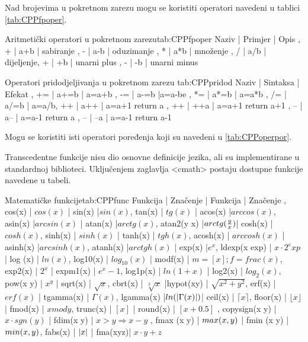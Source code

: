\documentclass[11pt]{book}
\begin{document}
Nad brojevima u pokretnom zarezu mogu se koristiti operatori navedeni u tablici \ref{tab:CPPfpoper}.

 {Aritmetički operatori u pokretnom zarezu}{tab:CPPfpoper}
{
  Naziv | Primjer  | Opis ,
  + | a+b | sabiranje ,
  - | a-b | oduzimanje ,
  * | a*b | množenje ,
  / | a/b | dijeljenje,
  + | +b  | unarni plus ,
  - | -b  | unarni minus
}

 {Operatori pridodjeljivanja u pokretnom zarezu} {tab:CPPpridod}
{
  Naziv | Sintaksa  | Efekat ,
  +=    | a+=b      | a=a+b ,
  -=    | a-=b      |a=a-be ,
  *=    | a*=b      | a=a*b ,
  /=    |  a/=b     | a=a/b,
  ++    |  a++      | a=a+1 return a ,
  ++    |  ++a      | a=a+1 return a+1 ,
  --    |  a--      | a=a-1 return a ,
  --    |  --a      | a=a-1 return a-1
}

Mogu se koristiti isti operatori poređenja koji su navedeni u \ref{tab:CPPoperpor}.

Transcedentne funkcije nisu dio osnovne definicije jezika, ali su implementirane u standardnoj biblioteci. Uključenjem zaglavlja <cmath> postaju dostupne funkcije navedene u tabeli.

 {Matematičke funkcije}{tab:CPPfunc}
{
  Funkcija           | Značenje            | Funkcija          | Značenje ,
  cos(x)             | $cos (x)$           | sin(x)            |$sin (x)$,
  tan(x)             | $tg (x) $           | acos(x)           |$arccos (x)$,
  asin(x)            |$arcsin (x)$         | atan(x)           |$arctg (x) $,
  atan2(y \com x)    |$arctg({y \over x })$| cosh(x)           | $cosh (x)$,
  sinh(x)            | $sinh (x)$          | tanh(x)           | $tgh (x)$,
  acosh(x)           | $arccosh (x)$       | asinh(x)          |$arcsinh (x)$,
  atanh(x)           |$arctgh (x)$         | exp(x)            |$e^x$,
  ldexp(x \com exp)  | $x \cdot 2 ^ exp $  | log (x)           | $ ln(x)$,
  log10(x)           | $ log_{10} (x) $    | modf(x)           | $ m=[x] ; f=frac(x) $,
  exp2(x)            | $2^x$               | expm1(x)          |  $e^x -1$,
  log1p(x)           | $ln(1+x)$           | log2(x)           | $ log_2 (x)  $,
  pow(x \com y)      | $ x ^ y$            | sqrt(x)           | $\sqrt{x} $,
  cbrt(x)            | $\sqrt[3]{x} $      |hypot(x\com y)     | $\sqrt{x^2 + y^2} $,
  erf(x)             |  $erf(x)$           | tgamma(x)         | $\Gamma(x)$,
  lgamma(x)        |$ln(|\Gamma(x)|)$| ceil(x)           | $\lceil x \rceil$,
  floor(x)           | $\lfloor x \rfloor$ | fmod(x)           | $ x mod y $,
  trunc(x)           | $ [ x ] $           | round(x)          | $ [ x+0.5 ] $ ,
  copysign(x \com y) | $ x \cdot sgn(y)$   | fdim(x \com y)    | $x>y \Rightarrow x-y $ ,
  fmax (x \com y)    |  $ max(x , y) $  | fmin (x \com y)   | $min(x , y) $,
  fabs(x)            |  $ | x |$     | fma(x\com y\com z)| $x \cdot y + z$
}
\end{document}
